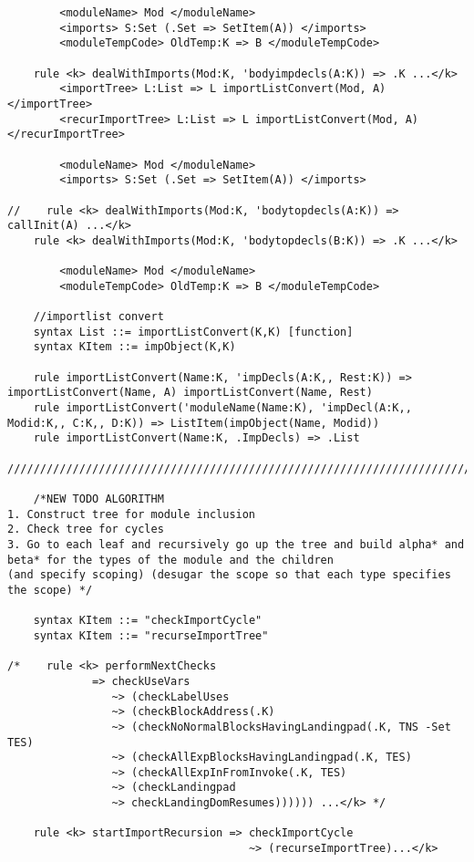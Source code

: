 \begin{lstlisting}
        <moduleName> Mod </moduleName>
        <imports> S:Set (.Set => SetItem(A)) </imports>
        <moduleTempCode> OldTemp:K => B </moduleTempCode>

    rule <k> dealWithImports(Mod:K, 'bodyimpdecls(A:K)) => .K ...</k>
        <importTree> L:List => L importListConvert(Mod, A) </importTree>
        <recurImportTree> L:List => L importListConvert(Mod, A) </recurImportTree>

        <moduleName> Mod </moduleName>
        <imports> S:Set (.Set => SetItem(A)) </imports>

//    rule <k> dealWithImports(Mod:K, 'bodytopdecls(A:K)) => callInit(A) ...</k>
    rule <k> dealWithImports(Mod:K, 'bodytopdecls(B:K)) => .K ...</k>

        <moduleName> Mod </moduleName>
        <moduleTempCode> OldTemp:K => B </moduleTempCode>

    //importlist convert
    syntax List ::= importListConvert(K,K) [function]
    syntax KItem ::= impObject(K,K)

    rule importListConvert(Name:K, 'impDecls(A:K,, Rest:K)) => importListConvert(Name, A) importListConvert(Name, Rest)
    rule importListConvert('moduleName(Name:K), 'impDecl(A:K,, Modid:K,, C:K,, D:K)) => ListItem(impObject(Name, Modid))
    rule importListConvert(Name:K, .ImpDecls) => .List

////////////////////////////////////////////////////////////////////////////////////////////////////////////////////////

    /*NEW TODO ALGORITHM
1. Construct tree for module inclusion
2. Check tree for cycles
3. Go to each leaf and recursively go up the tree and build alpha* and beta* for the types of the module and the children
(and specify scoping) (desugar the scope so that each type specifies the scope) */

    syntax KItem ::= "checkImportCycle"
    syntax KItem ::= "recurseImportTree"

/*    rule <k> performNextChecks
             => checkUseVars
                ~> (checkLabelUses
                ~> (checkBlockAddress(.K)
                ~> (checkNoNormalBlocksHavingLandingpad(.K, TNS -Set TES)
                ~> (checkAllExpBlocksHavingLandingpad(.K, TES)
                ~> (checkAllExpInFromInvoke(.K, TES)
                ~> (checkLandingpad
                ~> checkLandingDomResumes)))))) ...</k> */

    rule <k> startImportRecursion => checkImportCycle 
                                     ~> (recurseImportTree)...</k>


\end{lstlisting}
